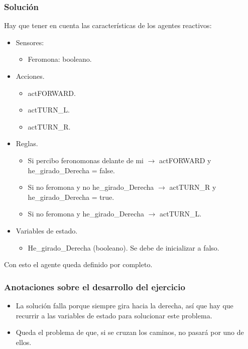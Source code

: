\subsubsection*{Solución}
Hay que tener en cuenta las características de los agentes reactivos:
\begin{itemize}
    \item Sensores:
    \begin{itemize}
        \item Feromona: booleano.
    \end{itemize}
    \item Acciones.
    \begin{itemize}
        \item actFORWARD.
        \item actTURN\_L.
        \item actTURN\_R.
    \end{itemize}
    \item Reglas.
    \begin{itemize}
        \item Si percibo feronomonas delante de mi $\rightarrow$ actFORWARD y he\_girado\_Derecha = false.
        \item Si no feromona y no he\_girado\_Derecha $\rightarrow$ actTURN\_R y he\_girado\_Derecha = true.
        \item Si no feromona y he\_girado\_Derecha $\rightarrow$ actTURN\_L.
    \end{itemize}
    \item Variables de estado.
    \begin{itemize}
        \item He\_girado\_Derecha (booleano). Se debe de inicializar a falso.
    \end{itemize}
\end{itemize}

Con esto el agente queda definido por completo.

\subsubsection*{Anotaciones sobre el desarrollo del ejercicio}
\begin{itemize}
    \item La solución falla porque siempre gira hacia la derecha, así que hay que recurrir a las variables de estado para solucionar este problema.
    \item Queda el problema de que, si se cruzan los caminos, no pasará por uno de ellos.
\end{itemize}


